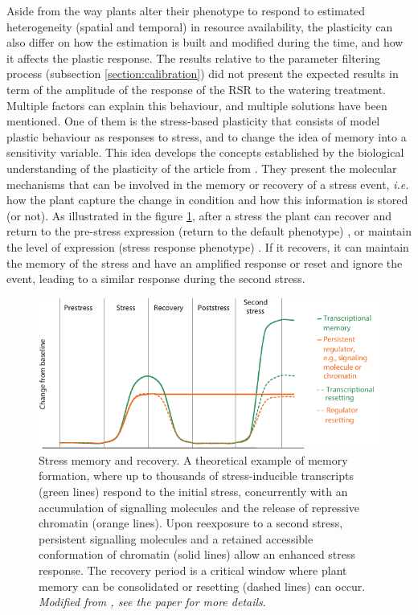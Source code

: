 Aside from the way plants alter their phenotype to respond to estimated heterogeneity (spatial and temporal) in resource availability, the plasticity can also differ on how the estimation is built and modified during the time, and how it affects the plastic response. The results relative to the parameter filtering process (subsection \ref{section:calibration}) did not present the expected results in term of the amplitude of the response of the RSR to the watering treatment. Multiple factors can explain this behaviour, and multiple solutions have been mentioned. One of them is the stress-based plasticity that consists of model plastic behaviour as responses to stress, and to change the idea of memory into a sensitivity variable. This idea develops the concepts established by the biological understanding of the plasticity of the article from \citet{crisp_reconsidering_2016}. They present the molecular mechanisms that can be involved in the memory or recovery of a stress event, \textit{i.e.} how the plant capture the change in condition and how this information is stored (or not). As illustrated in the figure \ref{fig:stress_memory}, after a stress the plant can recover and return to the pre-stress expression (return to the default phenotype) \parencite{liu_biomass_2004}, or maintain the level of expression (stress response phenotype) \parencite{peterson_growth_1982}. If it recovers, it can maintain the memory of the stress and have an amplified response or reset and ignore the event, leading to a similar response during the second stress.



\begin{figure}\label{fig:stress_memory}
\includegraphics[width = \textwidth]{./2_PP/Figures/Concepts/stress_memory.pdf}
\caption[Stress memory and recovery]{Stress memory and recovery. A theoretical example of memory formation, where up to thousands of stress-inducible transcripts (green lines) respond to the initial stress, concurrently with an accumulation of signalling molecules and the release of repressive chromatin (orange lines). Upon reexposure to a second stress, persistent signalling molecules and a retained accessible conformation of chromatin (solid lines) allow an enhanced stress response. The recovery period is a critical window where plant memory can be consolidated or resetting (dashed lines) can occur. \textit{Modified from \citet{crisp_reconsidering_2016}, see the paper for more details}.}
\end{figure}

